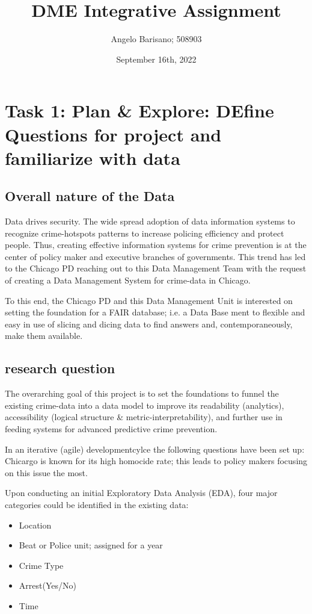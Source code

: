 \documentclass[a4paper]{article}
\begin{document}
\title{DME Integrative Assignment}
\author{Angelo Barisano; 508903 }
\date{September 16th, 2022}
\maketitle

\newpage
\section{Task 1: Plan \& Explore: DEfine Questions for project and familiarize with data}

\subsection{Overall nature of the Data}
Data drives security. The wide spread adoption of data information systems to recognize crime-hotspots patterns to increase policing efficiency and protect people. Thus, creating effective information systems for crime prevention is at the center of policy maker and executive branches of governments. This trend has led to the Chicago PD reaching out to this Data Management Team with the request of creating a Data Management System for crime-data in Chicago.

To this end, the Chicago PD and this Data Management Unit is interested on setting the foundation for a FAIR database; i.e. a Data Base ment to flexible and easy in use of slicing and dicing data to find answers and, contemporaneously, make them available. 

\subsection{research question}
The overarching goal of this project is to set the foundations to funnel the existing crime-data into a data model to improve its readability (analytics), accessibility (logical structure \& metric-interpretability), and further use in feeding systems for advanced predictive crime prevention. 


In an iterative (agile) developmentcylce the following questions have been set up: Chicargo is known for its high homocide rate; this leads to policy makers focusing on this issue the most. 

Upon conducting an initial Exploratory Data Analysis (EDA),  four major categories could be identified in the existing data: 

\begin{itemize}
  \item Location
  \item Beat or Police unit; assigned for a year
  \item Crime Type
  \item Arrest(Yes/No)
  \item Time 
\end{itemize}
\end{document}
